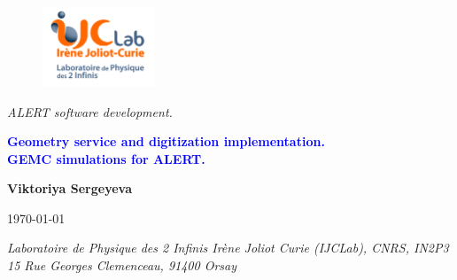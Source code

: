 \documentclass[11pt,a4paper,english]{report}
\begin{document}
		\renewcommand{\bibname}{Bibliography}
	
\begin{titlepage}
	\begin{figure}
		\includegraphics[width=0.3\textwidth]{logo_IJCLab.jpg}
	\end{figure}
	 
	\centering
	\vspace{20cm}		
	\textit{ALERT software development.}
	
	\vspace{5cm}	
		
	\Large {\textbf { \textcolor{blue} {Geometry service and digitization implementation. \\ GEMC simulations for ALERT.}}}
	
	\vspace{10cm}
	
	\Large{\textbf {Viktoriya Sergeyeva}}
	
	\today
	
	\vspace{1.5cm}
	\centering		
	\small { \textit {Laboratoire de Physique des 2 Infinis Irène Joliot Curie (IJCLab), CNRS, IN2P3 \\ 15 Rue Georges Clemenceau, 91400 Orsay}}	
\end{titlepage}

\tableofcontents


\newpage









%

	
	
	
	
	

\end{document}
